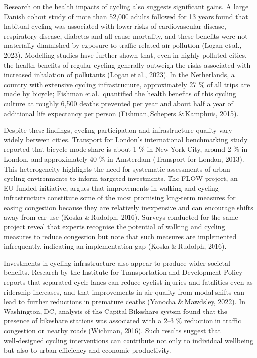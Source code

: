 \documentclass[
  12pt,
  oneside]{book}
\begin{document}
Research on the health impacts of cycling also suggests significant gains. A large Danish cohort study of more than 52,000 adults followed for 13 years found that habitual cycling was associated with lower risks of cardiovascular disease, respiratory disease, diabetes and all‑cause mortality, and these benefits were not materially diminished by exposure to traffic‑related air pollution (Logan et\,al., 2023). Modelling studies have further shown that, even in highly polluted cities, the health benefits of regular cycling generally outweigh the risks associated with increased inhalation of pollutants (Logan et\,al., 2023). In the Netherlands, a country with extensive cycling infrastructure, approximately 27 \% of all trips are made by bicycle; Fishman et\,al.~quantified the health benefits of this cycling culture at roughly 6,500 deaths prevented per year and about half a year of additional life expectancy per person (Fishman,\,Schepers \&\,Kamphuis, 2015).

Despite these findings, cycling participation and infrastructure quality vary widely between cities. Transport for London's international benchmarking study reported that bicycle mode share is about 1 \% in New York City, around 2 \% in London, and approximately 40 \% in Amsterdam (Transport for London, 2013). This heterogeneity highlights the need for systematic assessments of urban cycling environments to inform targeted investments. The FLOW project, an EU‑funded initiative, argues that improvements in walking and cycling infrastructure constitute some of the most promising long‑term measures for easing congestion because they are relatively inexpensive and can encourage shifts away from car use (Koska \&\,Rudolph, 2016). Surveys conducted for the same project reveal that experts recognise the potential of walking and cycling measures to reduce congestion but note that such measures are implemented infrequently, indicating an implementation gap (Koska \&\,Rudolph, 2016).

Investments in cycling infrastructure also appear to produce wider societal benefits. Research by the Institute for Transportation and Development Policy reports that separated cycle lanes can reduce cyclist injuries and fatalities even as ridership increases, and that improvements in air quality from modal shifts can lead to further reductions in premature deaths (Yanocha \&\,Mawdsley, 2022). In Washington, DC, analysis of the Capital Bikeshare system found that the presence of bikeshare stations was associated with a 2--3 \% reduction in traffic congestion on nearby roads (Wichman, 2016). Such results suggest that well‑designed cycling interventions can contribute not only to individual wellbeing but also to urban efficiency and economic productivity.
\end{document}
